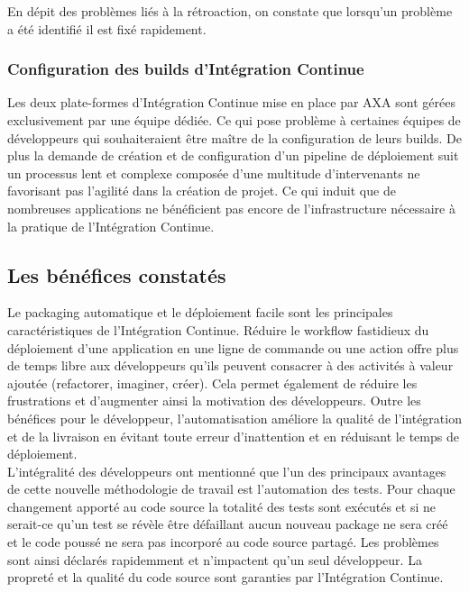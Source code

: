       En dépit des problèmes liés à la rétroaction, on constate que lorsqu'un problème a été identifié il est fixé rapidement.

      \subsubsection{Configuration des builds d'Intégration Continue}
      Les deux plate-formes d'Intégration Continue mise en place par AXA sont gérées exclusivement par une équipe dédiée. Ce qui pose problème à certaines équipes de développeurs qui souhaiteraient être maître de la configuration de leurs builds. De plus la demande de création et de configuration d'un pipeline de déploiement suit un processus lent et complexe composée d'une multitude d'intervenants ne favorisant pas l'agilité dans la création de projet. Ce qui induit que de nombreuses applications ne bénéficient pas encore de l'infrastructure nécessaire à la pratique de l'Intégration Continue.

    \subsection{Les bénéfices constatés}
    Le packaging automatique et le déploiement facile sont les principales caractéristiques de l'Intégration Continue. Réduire le workflow fastidieux du déploiement d'une application en une ligne de commande ou une action offre plus de temps libre aux développeurs qu'ils peuvent consacrer à des activités à valeur ajoutée (refactorer, imaginer, créer). Cela permet également de réduire les frustrations et d'augmenter ainsi la motivation des développeurs. Outre les bénéfices pour le développeur, l'automatisation améliore la qualité de l'intégration et de la livraison en évitant toute erreur d'inattention et en réduisant le temps de déploiement.\\

    L'intégralité des développeurs ont mentionné que l'un des principaux avantages de cette nouvelle méthodologie de travail est l'automation des tests. Pour chaque changement apporté au code source la totalité des tests sont exécutés et si ne serait-ce qu'un test se révèle être défaillant aucun nouveau package ne sera créé et le code poussé ne sera pas incorporé au code source partagé. Les problèmes sont ainsi déclarés rapidemment et n'impactent qu'un seul développeur. La propreté et la qualité du code source sont garanties par l'Intégration Continue.\\

